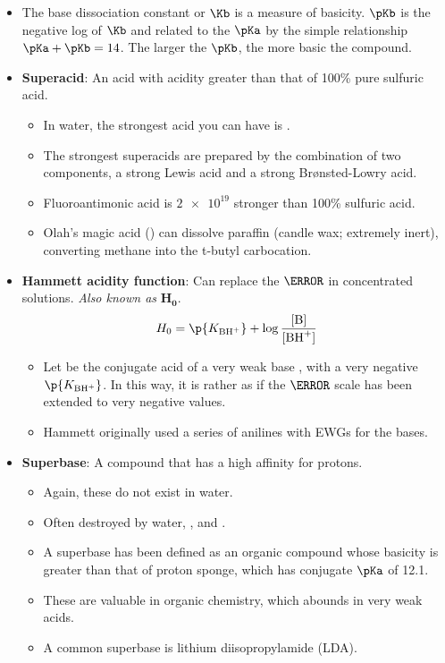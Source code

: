 \documentclass[../notes.tex]{subfiles}
\begin{document}
\begin{itemize}
    \item The base dissociation constant or $\Kb$ is a measure of basicity. $\pKb$ is the negative log of $\Kb$ and related to the $\pKa$ by the simple relationship $\pKa+\pKb=14$. The larger the $\pKb$, the more basic the compound.
    \item \textbf{Superacid}: An acid with acidity greater than that of 100\% pure sulfuric acid.
    \begin{itemize}
        \item In water, the strongest acid you can have is .
        \item The strongest superacids are prepared by the combination of two components, a strong Lewis acid and a strong Br{\o}nsted-Lowry acid.
        \item Fluoroantimonic acid  is $\num{2e19}$ stronger than 100\% sulfuric acid.
        \item Olah's magic acid () can dissolve paraffin (candle wax; extremely inert), converting methane into the t-butyl carbocation.
    \end{itemize}
    \item \textbf{Hammett acidity function}: Can replace the $\pH$ in concentrated solutions. \emph{Also known as} $\bm{H_0}$.
    \begin{equation*}
        H_0 = \p{K_{\ce{BH^+}}}+\log\frac{[\ce{B}]}{[\ce{BH^+}]}
    \end{equation*}
    \begin{itemize}
        \item Let  be the conjugate acid of a very weak base , with a very negative $\p{K_{\ce{BH+}}}$. In this way, it is rather as if the $\pH$ scale has been extended to very negative values.
        \item Hammett originally used a series of anilines with EWGs for the bases.
    \end{itemize}
    \item \textbf{Superbase}: A compound that has a high affinity for protons.
    \begin{itemize}
        \item Again, these do not exist in water.
        \item Often destroyed by water, , and .
        \item A superbase has been defined as an organic compound whose basicity is greater than that of proton sponge, which has conjugate $\pKa$ of 12.1.
        \item These are valuable in organic chemistry, which abounds in very weak acids.
        \item A common superbase is lithium diisopropylamide (LDA).
    \end{itemize}
\end{itemize}
\end{document}
